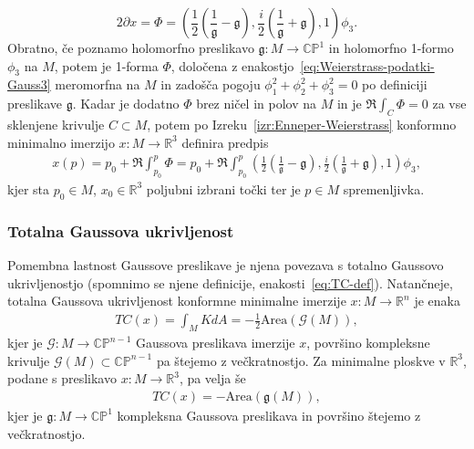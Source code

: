 \documentclass[12pt,a4paper,twoside]{article}
\theoremstyle{definition} %
\theoremstyle{plain} %
\numberwithin{equation}{section}  %
\newcommand{\R}{\mathbb R}
\begin{document}
\begin{equation} \label{eq:Weierstrass-podatki-Gauss3}
2 \partial x = \Phi = \left( \frac{1}{2} \left(\frac{1}{\mathfrak{g}} - \mathfrak{g} \right), \frac{i}{2} \left(\frac{1}{\mathfrak{g}} + \mathfrak{g} \right), 1 \right) \phi_3.
\end{equation}
Obratno, če poznamo holomorfno preslikavo $\mathfrak{g} \colon M \to \mathbb{CP}^{1}$ in holomorfno 1-formo $\phi_3$ na $M$, potem je 1-forma $\Phi$, določena z enakostjo~\eqref{eq:Weierstrass-podatki-Gauss3} meromorfna na $M$ in zadošča pogoju $\phi_{1}^2 + \phi_{2}^2 + \phi_{3}^2 = 0$ po definiciji preslikave $\mathfrak{g}$.
Kadar je dodatno $\Phi$ brez ničel in polov na $M$ in je $\Re \int_{C} \Phi = 0$ za vse sklenjene krivulje $C \subset M$, potem po Izreku~\ref{izr:Enneper-Weierstrass} konformno minimalno imerzijo $x \colon M \to \mathbb{R}^3$ definira predpis
\begin{gather}
x(p) = p_{0} + \Re \int_{p_0}^{p} \Phi = p_{0} + \Re \int_{p_0}^{p} \left( \frac{1}{2} \left(\frac{1}{\mathfrak{g}} - \mathfrak{g} \right), \frac{i}{2} \left(\frac{1}{\mathfrak{g}} + \mathfrak{g} \right), 1 \right) \phi_3,
\end{gather}
kjer sta $p_0 \in M$, $x_0 \in \mathbb{R}^3$ poljubni izbrani točki ter je $p \in M$ spremenljivka.

\subsubsection{Totalna Gaussova ukrivljenost}
%
Pomembna lastnost Gaussove preslikave je njena povezava s totalno Gaussovo ukrivljenostjo (spomnimo se njene definicije, enakosti~\eqref{eq:TC-def}).
Natančneje, totalna Gaussova ukrivljenost konformne minimalne imerzije $x \colon M \to \R^{n}$ je enaka
\begin{gather}
TC(x) = \int_{M} KdA = -\frac{1}{2} \text{Area}(\mathcal{G}(M)),
\end{gather} 
kjer je $\mathcal{G} \colon M \to \mathbb{CP}^{n-1}$ Gaussova preslikava imerzije $x$, površino kompleksne krivulje $\mathcal{G}(M) \subset \mathbb{CP}^{n-1}$ pa štejemo z večkratnostjo.
Za minimalne ploskve v $\R^{3}$, podane s preslikavo $x \colon M \to \R^3$, pa velja še
\begin{gather}
TC(x) = - \text{Area}(\mathfrak{g}(M)),
\end{gather}
kjer je $\mathfrak{g} \colon M \to \mathbb{CP}^1$ kompleksna Gaussova preslikava in površino štejemo z večkratnostjo.
\end{document}
